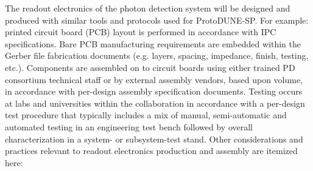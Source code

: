 The readout electronics of the photon detection system will be designed and produced with similar tools and protocols used for  ProtoDUNE-SP. For example: printed circuit board (PCB) layout is performed in accordance with IPC specifications. Bare PCB manufacturing requirements are embedded within the Gerber file fabrication documents (e.g. layers, spacing, impedance, finish, testing, etc.). Components are assembled on to circuit boards using either trained PD consortium technical staff or by external assembly vendors, based upon volume, in accordance with per-design assembly specification documents. Testing occurs at labs and universities within the collaboration in accordance with a per-design test procedure that typically includes a mix of manual, semi-automatic and automated testing in an engineering test bench followed by overall characterization in a system- or subsystem-test stand.
Other considerations and practices relevant to readout electronics production and assembly are itemized here:

